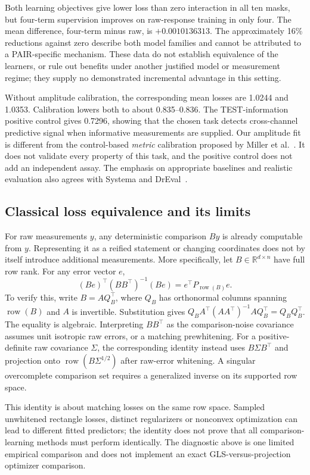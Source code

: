 \documentclass[11pt]{article}
\begin{document}
Both learning objectives give lower loss than zero interaction in all ten masks, but four-term supervision improves on raw-response training in only four. The mean difference, four-term minus raw, is $+0.0010136313$. The approximately 16\% reductions against zero describe both model families and cannot be attributed to a PAIR-specific mechanism. These data do not establish equivalence of the learners, or rule out benefits under another justified model or measurement regime; they supply no demonstrated incremental advantage in this setting.

Without amplitude calibration, the corresponding mean losses are 1.0244 and 1.0353. Calibration lowers both to about 0.835--0.836. The TEST-information positive control gives 0.7296, showing that the chosen task detects cross-channel predictive signal when informative measurements are supplied. Our amplitude fit is different from the control-based \emph{metric} calibration proposed by Miller et al.~\cite{miller2026calibrated}. It does not validate every property of this task, and the positive control does not add an independent assay. The emphasis on appropriate baselines and realistic evaluation also agrees with Systema and DrEval~\cite{vinas2026systema,bernett2026dreval}.

\subsection{Classical loss equivalence and its limits}
For raw measurements $y$, any deterministic comparison $By$ is already computable from $y$. Representing it as a reified statement or changing coordinates does not by itself introduce additional measurements. More specifically, let $B\in\mathbb R^{d\times n}$ have full row rank. For any error vector $e$,
\[
 (Be)^\top(BB^\top)^{-1}(Be)
   =e^\top P_{\operatorname{row}(B)}e.
\]
To verify this, write $B=AQ_B^\top$, where $Q_B$ has orthonormal columns spanning $\operatorname{row}(B)$ and $A$ is invertible. Substitution gives $Q_BA^\top(AA^\top)^{-1}AQ_B^\top=Q_BQ_B^\top$. The equality is algebraic. Interpreting $BB^\top$ as the comparison-noise covariance assumes unit isotropic raw errors, or a matching prewhitening. For a positive-definite raw covariance $\Sigma$, the corresponding identity instead uses $B\Sigma B^\top$ and projection onto $\operatorname{row}(B\Sigma^{1/2})$ after raw-error whitening. A singular overcomplete comparison set requires a generalized inverse on its supported row space.

This identity is about matching losses on the same row space. Sampled unwhitened rectangle losses, distinct regularizers or nonconvex optimization can lead to different fitted predictors; the identity does not prove that all comparison-learning methods must perform identically. The diagnostic above is one limited empirical comparison and does not implement an exact GLS-versus-projection optimizer comparison.
\end{document}
